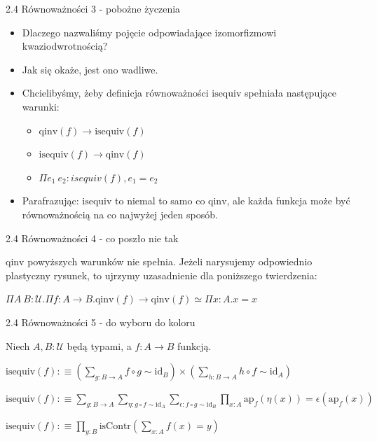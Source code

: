 \documentclass{beamer}
\newcommand{\U}{\mathcal{U}}
\newcommand{\ap}[2]{\text{ap}_{#1}(#2)}
\newcommand{\qinv}{\text{qinv}}
\newcommand{\isequiv}{\text{isequiv}}
\newcommand{\id}{\text{id}}
\newcommand{\comp}{\circ}
\begin{document}
\begin{frame}{2.4 Równoważności 3 - pobożne życzenia}
\begin{itemize}
	\item Dlaczego nazwaliśmy pojęcie odpowiadające izomorfizmowi kwaziodwrotnością?
	\item Jak się okaże, jest ono wadliwe.
	\item Chcielibyśmy, żeby definicja równoważności $\isequiv$ spełniała następujące warunki:
	\begin{itemize}
		\item $\qinv(f) \to \isequiv(f)$
		\item $\isequiv(f) \to \qinv(f)$
		\item $\Pi e_1\ e_2 : isequiv(f), e_1 = e_2$
	\end{itemize}
	\item Parafrazując: $\isequiv$ to niemal to samo co $\qinv$, ale każda funkcja może być równoważnością na co najwyżej jeden sposób.
\end{itemize}
\end{frame}

\begin{frame}{2.4 Równoważności 4 - co poszło nie tak}

$\qinv$ powyższych warunków nie spełnia. Jeżeli narysujemy odpowiednio plastyczny rysunek, to ujrzymy uzasadnienie dla poniższego twierdzenia:

\begin{theorem}

$\Pi A\ B : \U. \Pi f : A \to B. \qinv(f) \to \qinv(f) \simeq \Pi x : A. x = x$

\end{theorem}

\end{frame}

\begin{frame}{2.4 Równoważności 5 - do wyboru do koloru}

Niech $A, B : \U$ będą typami, a $f : A \to B$ funkcją.

\begin{definition}[Równoważność 1]
$
\displaystyle
	\isequiv(f) :\equiv
		\left(\sum_{g : B \to A} f \comp g \sim \id_B\right) \times
		\left(\sum_{h : B \to A} h \comp f \sim \id_A\right)
$
\end{definition}

\begin{definition}[Równoważność 2]
$
\displaystyle
	\isequiv(f) :\equiv
		\sum_{g : B \to A} \sum_{\eta : g \comp f \sim \id_A} \sum_{\epsilon : f \comp g \sim \id_B}
			\prod_{x : A} \ap{f}{\eta(x)} = \epsilon(\ap{f}{x})
$
\end{definition}

\begin{definition}[Równoważność 3]
$
\displaystyle
	\isequiv(f) :\equiv
		\prod_{y : B} \text{isContr}\left(\sum_{x : A} f(x) = y\right)
$
\end{definition}

\end{frame}
\end{document}
